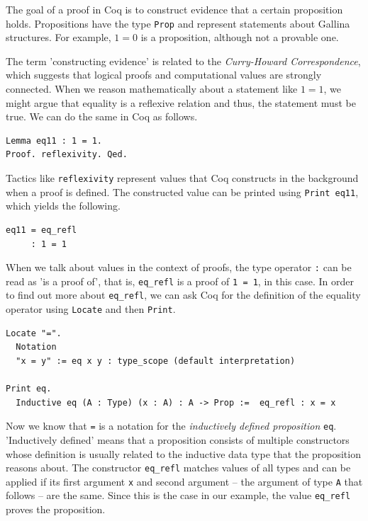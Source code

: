 \documentclass[a4paper, 11pt, fleqn, twoside]{scrreprt}
\newcommand{\cinl}[1]{\texttt{#1}}
\begin{document}
The goal of a proof in Coq is to construct evidence that a certain proposition holds.
Propositions have the type \cinl{Prop} and represent statements about Gallina structures.
For example, $1 = 0$ is a proposition, although not a provable one.

The term 'constructing evidence' is related to the \textit{Curry-Howard Correspondence}, which suggests that logical proofs and computational values are strongly connected.
When we reason mathematically about a statement like $1 = 1$, we might argue that equality is a reflexive relation and thus, the statement must be true.
We can do the same in Coq as follows.

\begin{verbatim}
Lemma eq11 : 1 = 1.
Proof. reflexivity. Qed.
\end{verbatim}

Tactics like \cinl{reflexivity} represent values that Coq constructs in the background when a proof is defined.
The constructed value can be printed using \cinl{Print eq11}, which yields the following.

\begin{verbatim}
eq11 = eq_refl
     : 1 = 1
\end{verbatim}

When we talk about values in the context of proofs, the type operator \cinl{:} can be read as 'is a proof of', that is, \cinl{eq_refl} is a proof of \cinl{1 = 1}, in this case.
In order to find out more about \cinl{eq_refl}, we can ask Coq for the definition of the equality operator using \cinl{Locate} and then \cinl{Print}.

\begin{verbatim}
Locate "=".
  Notation
  "x = y" := eq x y : type_scope (default interpretation)

Print eq.
  Inductive eq (A : Type) (x : A) : A -> Prop :=  eq_refl : x = x
\end{verbatim}

Now we know that \cinl{=} is a notation for the \textit{inductively defined proposition} \cinl{eq}.
'Inductively defined' means that a proposition consists of multiple constructors whose definition is usually related to the inductive data type that the proposition reasons about.
The constructor \cinl{eq_refl} matches values of all types and can be applied if its first argument \cinl{x} and second argument -- the argument of type \cinl{A} that follows -- are the same.
Since this is the case in our example, the value \cinl{eq_refl} proves the proposition.
\end{document}
